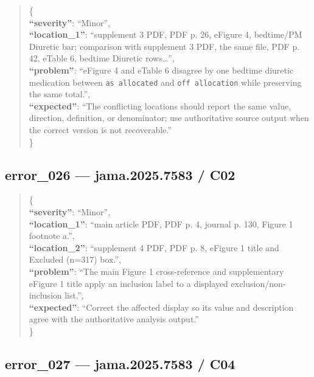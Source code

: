 \documentclass[
  letterpaper,
  9pt]{extreport}
\begin{document}
\begin{quote}
\{\\
\textbf{``severity''}: ``Minor'',\\
\textbf{``location\_1''}: ``supplement 3 PDF, PDF p. 26, eFigure 4,
bedtime/PM Diuretic bar; comparison with supplement 3 PDF, the same
file, PDF p. 42, eTable 6, bedtime Diuretic rows\ldots{}'',\\
\textbf{``problem''}: ``eFigure 4 and eTable 6 disagree by one bedtime
diuretic medication between \texttt{as\ allocated} and
\texttt{off\ allocation} while preserving the same total.'',\\
\textbf{``expected''}: ``The conflicting locations should report the
same value, direction, definition, or denominator; use authoritative
source output when the correct version is not recoverable.''\\
\}
\end{quote}

\hypertarget{error_026--jama20257583--c02}{%
\subsection{error\_026 --- jama.2025.7583 /
C02}\label{error_026--jama20257583--c02}}

\begin{quote}
\{\\
\textbf{``severity''}: ``Minor'',\\
\textbf{``location\_1''}: ``main article PDF, PDF p. 4, journal p. 130,
Figure 1 footnote a.'',\\
\textbf{``location\_2''}: ``supplement 4 PDF, PDF p. 8, eFigure 1 title
and Excluded (n=317) box.'',\\
\textbf{``problem''}: ``The main Figure 1 cross-reference and
supplementary eFigure 1 title apply an inclusion label to a displayed
exclusion/non-inclusion list.'',\\
\textbf{``expected''}: ``Correct the affected display so its value and
description agree with the authoritative analysis output.''\\
\}
\end{quote}

\hypertarget{error_027--jama20257583--c04}{%
\subsection{error\_027 --- jama.2025.7583 /
C04}\label{error_027--jama20257583--c04}}
\end{document}
